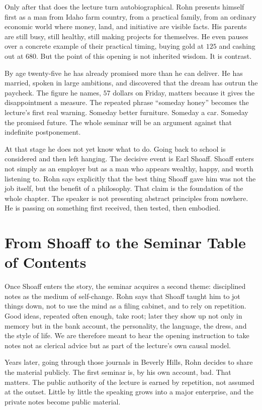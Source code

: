 Only after that does the lecture turn autobiographical. Rohn presents himself first as a man from Idaho farm country, from a practical family, from an ordinary economic world where money, land, and initiative are visible facts. His parents are still busy, still healthy, still making projects for themselves. He even pauses over a concrete example of their practical timing, buying gold at \(125\) and cashing out at \(680\). But the point of this opening is not inherited wisdom. It is contrast.

By age twenty-five he has already promised more than he can deliver. He has married, spoken in large ambitions, and discovered that the dream has outrun the paycheck. The figure he names, \(57\) dollars on Friday, matters because it gives the disappointment a measure. The repeated phrase ``someday honey'' becomes the lecture's first real warning. Someday better furniture. Someday a car. Someday the promised future. The whole seminar will be an argument against that indefinite postponement.

At that stage he does not yet know what to do. Going back to school is considered and then left hanging. The decisive event is Earl Shoaff. Shoaff enters not simply as an employer but as a man who appears wealthy, happy, and worth listening to. Rohn says explicitly that the best thing Shoaff gave him was not the job itself, but the benefit of a philosophy. That claim is the foundation of the whole chapter. The speaker is not presenting abstract principles from nowhere. He is passing on something first received, then tested, then embodied.

\section{From Shoaff to the Seminar Table of Contents}

Once Shoaff enters the story, the seminar acquires a second theme: disciplined notes as the medium of self-change. Rohn says that Shoaff taught him to jot things down, not to use the mind as a filing cabinet, and to rely on repetition. Good ideas, repeated often enough, take root; later they show up not only in memory but in the bank account, the personality, the language, the dress, and the style of life. We are therefore meant to hear the opening instruction to take notes not as clerical advice but as part of the lecture's own causal model.

Years later, going through those journals in Beverly Hills, Rohn decides to share the material publicly. The first seminar is, by his own account, bad. That matters. The public authority of the lecture is earned by repetition, not assumed at the outset. Little by little the speaking grows into a major enterprise, and the private notes become public material.

